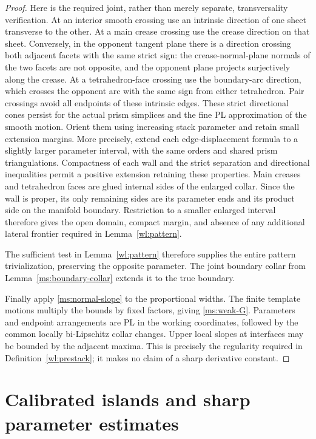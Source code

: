 \begin{proof}
Here is the required joint, rather than merely separate,
transversality verification.  At an interior smooth crossing use
an intrinsic direction of one sheet transverse to the other.  At
a main crease crossing use the crease direction on that sheet.
Conversely, in the opponent tangent plane there is a direction
crossing both adjacent facets with the same strict sign: the
crease-normal-plane normals of the two facets are not opposite,
and the opponent plane projects surjectively along the crease.
At a tetrahedron-face crossing use the boundary-arc direction,
which crosses the opponent arc with the same sign from either
tetrahedron.  Pair crossings avoid all endpoints of these intrinsic
edges.  These strict directional cones persist for the actual
prism simplices and the fine PL approximation of the smooth
motion.  Orient them using increasing stack parameter and retain
small extension margins.  More precisely, extend each
edge-displacement formula to a slightly larger parameter interval,
with the same orders and shared prism triangulations.  Compactness
of each wall and the strict separation and directional inequalities
permit a positive extension retaining these properties.  Main
creases and tetrahedron faces are glued internal sides of the
enlarged collar.  Since the wall is proper, its only remaining sides
are its parameter ends and its product side on the manifold
boundary.  Restriction to a smaller enlarged interval therefore
gives the open domain, compact margin, and absence of any additional
lateral frontier required in Lemma~\ref{wl:pattern}.

The sufficient test in Lemma~\ref{wl:pattern}
therefore supplies the entire pattern trivialization, preserving
the opposite parameter.  The joint boundary collar from
Lemma~\ref{ms:boundary-collar} extends it to the true boundary.

Finally apply \eqref{ms:normal-slope} to the proportional widths.
The finite template motions multiply the bounds by fixed factors,
giving \eqref{ms:weak-G}.  Parameters and endpoint arrangements are
PL in the working coordinates, followed by the common locally
bi-Lipschitz collar changes.  Upper local slopes at interfaces may
be bounded by the adjacent maxima.  This is precisely the
regularity required in Definition~\ref{wl:prestack}; it makes no claim of a
sharp derivative constant.
\end{proof}

\section{Calibrated islands and sharp parameter estimates}
\label{sec:calibrated-islands}

